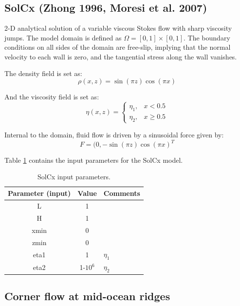 \documentclass[a4paper,11pt]{article}
\begin{document}
\subsection{SolCx (Zhong 1996, Moresi et al. 2007)}
2-D analytical solution of a variable viscous Stokes flow with sharp viscosity jumps. The model domain is defined as $\Omega = [0, 1] \times [0, 1]$. The boundary conditions on all sides of the domain are free-slip, implying that the normal velocity to each wall is zero, and the tangential stress along the wall vanishes. 

The density field is set as:
\begin{equation}
\rho(x,z) = \sin(\pi z) \cos(\pi x)
\end{equation}

And the viscosity field is set as:
\begin{equation}
\eta(x,z) = \left\{\begin{array}{lr}
    \eta_1, &  x < 0.5\\
    \eta_2, & x\ge 0.5
  \end{array}\right.
\end{equation}

Internal to the domain, fluid flow is driven by a sinusoidal force given by:
\begin{equation}
F = (0,-\sin(\pi z) \cos(\pi x)^T
\end{equation}

Table \ref{tab:solcx} contains the input parameters for the SolCx model.

\begin{table}[h]
\begin{center}
\footnotesize
\begin{tabular}{c c l}
\hline 
Parameter (input)&Value&Comments\\
\hline
L&1&\\
H&1&\\
xmin&0&\\
zmin&0&\\
eta1&1&$\eta_1$\\
eta2&1-$10^6$&$\eta_2$\\
\hline  
\end{tabular}
\caption{SolCx input parameters.}
\label{tab:solcx}
\end{center}
\end{table}

\subsection{Corner flow at mid-ocean ridges}
\end{document}
